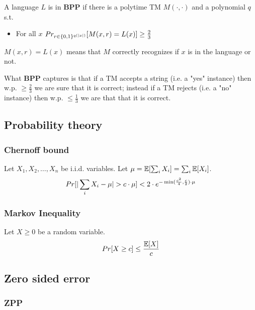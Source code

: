         \begin{definition}[BPP]\label{def:bpp}
            A language $L$ is in \textbf{BPP} if there is a polytime TM $M(\cdot, \cdot)$ and a polynomial $q$ s.t.
            \begin{itemize}
                \item For all $x$ $Pr_{r \in \{ 0,1 \}^{q(\vert x \vert)}} [M(x,r) = L(x)] \geq \frac{2}{3} $
            \end{itemize}
        \end{definition}

        $M(x,r) = L(x)$ means that $M$ correctly recognizes if $x$ is in the language or not.

        What \textbf{BPP} captures is that if a TM accepts a string (i.e. a "yes" instance) then w.p. $\geq \frac{2}{3}$ we are sure that it is correct;
        instead if a TM rejects (i.e. a "no" instance) then w.p. $\leq \frac{1}{3}$ we are that that it is correct.


\subsection{Probability theory}\label{subsec:prob_theory}

        \subsubsection{Chernoff bound}\label{subsubsec:chernoff}
            Let $X_1, X_2, \dots, X_n$ be i.i.d. variables.
            Let $\mu = \mathbb{E}[\sum_i X_i] = \sum_i \mathbb{E}[X_i]$.
            \[ Pr [ \vert  \sum_i X_i - \mu  \vert > c \cdot \mu ] < 2 \cdot e^{ -\min (\frac{c^2}{4}, \frac{c}{2}) \cdot \mu } \]

        \subsubsection{Markov Inequality}\label{subsubsec:markov}
            Let $X \geq 0$ be a random variable.
            \[ Pr [X \geq c] \leq \frac{\mathbb{E}[X]}{c} \]


\subsection{Zero sided error}\label{subsec:rand_zero_sided}

    \subsubsection{\textbf{ZPP}}\label{subsubsec:zpp}

